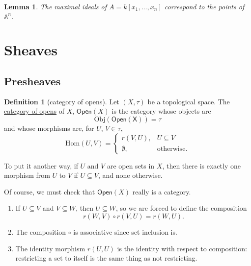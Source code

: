 \documentclass[a4paper,10pt]{scrreprt}
\newcommand{\defn}[1]{\ul{#1}}
\newcommand{\Obj}{\mathrm{Obj}}
\newcommand{\Hom}{\mathrm{Hom}}
\theoremstyle{definition}
\newtheorem{definition}{Definition}[section]
\theoremstyle{plain}
\newtheorem{lemma}{Lemma}[section]
\theoremstyle{remark}
\begin{document}
\begin{lemma}
  The maximal ideals of $A = k[x_{1}, \ldots, x_{n}]$ correspond to the points of $\mathbb{A}^{n}$.
\end{lemma}

\section{Sheaves}
\subsection{Presheaves}

\begin{definition}[category of opens] 
  \label{def:opencategory} 
  Let $(X, \tau)$ be a topological space. The \defn{category of opens} of $X$, $\mathsf{Open}(X)$ is the category whose objects are 
  \begin{equation*}
    \Obj(\mathsf{Open(X)}) = \tau 
  \end{equation*} and whose morphisms are, for $U$, $V \in \tau$, 
  \begin{equation*} 
    \Hom(U,V) =
    \begin{cases} 
      r(V,U), & U \subseteq V \\ 
      \emptyset, & \text{otherwise}.  
    \end{cases} 
  \end{equation*}

  To put it another way, if $U$ and $V$ are open sets in $X$, then there is exactly one morphism from $U$ to $V$ if $U \subseteq V$, and none otherwise.
\end{definition}

Of course, we must check that $\mathsf{Open}(X)$ really is a category.
\begin{enumerate} 
  \item If $U \subseteq V$ and $V \subseteq W$, then $U \subseteq W$, so we are forced to define the composition 
    \begin{equation*} 
      r(W,V) \circ r(V,U) = r(W,U).  
    \end{equation*} 
  \item The composition $\circ$ is associative since set inclusion is.

  \item The identity morphism $r(U,U)$ is the identity with respect to composition: restricting a set to itself is the same thing as not restricting.  
\end{enumerate}
\end{document}
